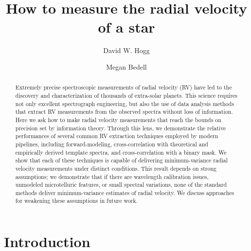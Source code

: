 \documentclass[modern]{aastex631}
\newcommand{\acronym}[1]{\textsc{#1}}
\newcommand{\RV}{\acronym{RV}}
\begin{document}
\title{How to measure the radial velocity of a star}%
\author[0000-0003-2866-9403]{David W. Hogg}

\author[0000-0001-9907-7742]{Megan Bedell}

\begin{abstract}\noindent
    Extremely precise spectroscopic measurements of radial velocity (\RV) have led to the discovery and characterization of thousands of extra-solar planets.
    This science requires not only excellent spectrograph engineering, but also the use of data analysis methods that extract RV measurements from the observed spectra without loss of information. 
    Here we ask how to make radial velocity measurements that reach the bounds on precision set by information theory. 
    Through this lens, we demonstrate the relative performances of several common RV extraction techniques employed by modern pipelines, including forward-modeling, cross-correlation with theoretical and empirically derived template spectra, and cross-correlation with a binary mask. 
    We show that each of these techniques is capable of delivering minimum-variance radial velocity measurements under distinct conditions. 
    This result depends on strong assumptions; we demonstrate that if there are wavelength calibration issues, unmodeled microtelluric features, or small spectral variations, none of the standard methods deliver minimum-variance estimates of radial velocity. 
    We discuss approaches for weakening these assumptions in future work.
\end{abstract}


\section{Introduction}\label{sec:intro}
\end{document}
